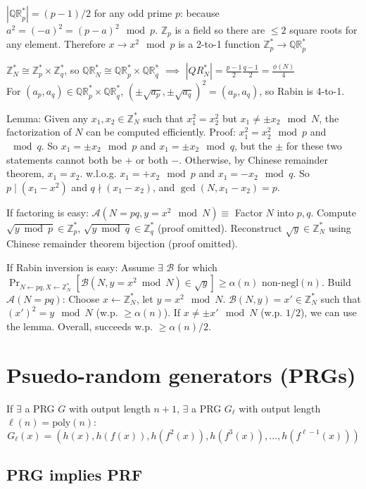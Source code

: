 \documentclass[11pt]{article}
\newcommand{\eqdef}{\ensuremath{\equiv}}
\newcommand{\abs}[1]{{\ensuremath{\left\vert#1\right\vert}}}
\newcommand{\ZZ}{\ensuremath{\mathds{Z}}}
\newcommand{\QR}{\ensuremath{\mathds{QR}}}
\newcommand{\divides}{\mid}
\newcommand{\negl}{\text{negl}}
\newcommand{\poly}{\text{poly}}
\newcommand{\AAA}{\ensuremath{\mathcal{A}}}
\newcommand{\BBB}{\ensuremath{\mathcal{B}}}
\theoremstyle{remark}
\begin{document}
$\abs{\QR_p^*}=(p-1)/2$ for any odd prime $p$:
because $a^2 = (-a)^2 = (p-a)^2 \mod p$.
$\ZZ_p$ is a field so there are $\le 2$ square roots for any element.
Therefore $x \rightarrow x^2 \mod p$ is a 2-to-1 function $\ZZ_p^* \rightarrow \QR_p^*$

$\ZZ_N^* \cong \ZZ_p^* \times \ZZ_q^*$, so $\QR_N^* \cong \QR_p^* \times \QR_q^*$
$\implies$ $\abs{QR_N^*} = \frac{p-1}{2}\frac{q-1}{2} = \frac{\phi(N)}{4}$ \\
For $(a_p, a_q) \in \QR_p^*\times\QR_q^*$, $(\pm\sqrt{a_p},\pm\sqrt{a_q})^2 = (a_p,a_q)$,
so Rabin is 4-to-1.

Lemma: Given any $x_1, x_2 \in \ZZ_N^*$ such that $x_1^2 = x_2^2$ but $x_1 \neq \pm x_2 \mod N$,
the factorization of $N$ can be computed efficiently.
Proof: $x_1^2 = x_2^2 \mod p$ and $\mod q$.
So $x_1=\pm x_2 \mod p$ and $x_1=\pm x_2 \mod q$, but the $\pm$ for these
two statements cannot both be $+$ or both $-$.
Otherwise, by Chinese remainder theorem, $x_1 = x_2$.
w.l.o.g. $x_1 = +x_2 \mod p$ and $x_1 = -x_2 \mod q$.
So $p \divides (x_1-x^2)$ and $q\nmid(x_1-x_2)$,
and $\gcd(N, x_1-x_2) = p$.

If factoring is easy: $\AAA(N=pq, y=x^2\mod N)\eqdef$
Factor $N$ into $p,q$.
Compute $\sqrt{y\bmod p}\in\ZZ_p^*$, $\sqrt{y\bmod q}\in\ZZ_q^*$ (proof omitted).
Reconstruct $\sqrt{y}\in\ZZ_N^*$ using Chinese remainder theorem bijection (proof omitted).

If Rabin inversion is easy:
Assume $\exists$ $\BBB$ for which
$\Pr_{N\gets pq,X\gets\ZZ_N^*}[\BBB(N, y=x^2\bmod N)\in\sqrt{y}] \ge \alpha(n)$ non-$\negl(n)$.
Build $\AAA(N=pq)$: Choose $x\gets\ZZ_N^*$, let $y=x^2\mod N$.
$\BBB(N, y) = x' \in \ZZ_N^*$ such that $(x')^2 = y \mod N$ (w.p. $\ge\alpha(n)$).
If $x \neq \pm x' \mod N$ (w.p. $1/2$), we can use the lemma.
Overall, succeeds w.p. $\ge \alpha(n)/2$.

\section{Psuedo-random generators (PRGs)}

If $\exists$ a PRG $G$ with output length $n+1$, $\exists$ a PRG $G_\ell$ with
output length $\ell(n) = \poly(n)$:
\[G_\ell(x) = ( h(x), h(f(x)), h(f^2(x)), h(f^3(x)), \ldots, h(f^{\ell-1}(x)) )\]

\subsection{PRG implies PRF}
\end{document}

